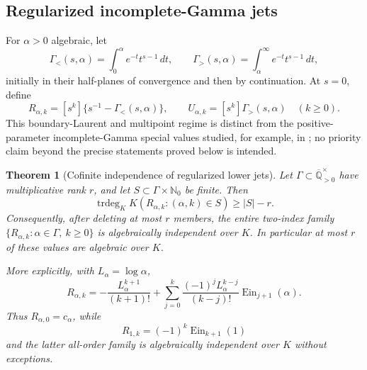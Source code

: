 \documentclass[11pt]{article}
\theoremstyle{keio}
\newtheorem{theorem}{Theorem}[section]
\theoremstyle{definition}
\theoremstyle{remark}
\newcommand{\Qbar}{\overline{\mathbb Q}}
\newcommand{\N}{\mathbb N}
\newcommand{\Ein}{\operatorname{Ein}}
\newcommand{\trdeg}{\operatorname{trdeg}}
\begin{document}
\subsection*{Regularized incomplete-Gamma jets}

For \(\alpha>0\) algebraic, let
\[
 \Gamma_{<}(s,\alpha)=\int_0^\alpha e^{-t}t^{s-1}\,dt,
 \qquad
 \Gamma_{>}(s,\alpha)=\int_\alpha^\infty e^{-t}t^{s-1}\,dt,
\]
initially in their half-planes of convergence and then by continuation.
At \(s=0\), define
\begin{equation}\label{eq:incomplete-gamma-jets}
 R_{\alpha,k}=[s^k]\{s^{-1}-\Gamma_{<}(s,\alpha)\},
 \qquad
 U_{\alpha,k}=[s^k]\Gamma_{>}(s,\alpha)
 \quad(k\ge0).
\end{equation}
This boundary-Laurent and multipoint regime is distinct from the
positive-parameter incomplete-Gamma special values studied, for example,
in \cite{MurtySaha2015}; no priority claim beyond the precise statements
proved below is intended.

\begin{theorem}[Cofinite independence of regularized lower jets]
\label{thm:lower-gamma-jets}
Let \(\Gamma\subset\Qbar_{>0}^{\times}\) have multiplicative rank \(r\),
and let \(S\subset\Gamma\times\N_0\) be finite.  Then
\begin{equation}\label{eq:lower-gamma-jet-defect}
 \boxed{\displaystyle
 \trdeg_KK(R_{\alpha,k}:(\alpha,k)\in S)\ge |S|-r.}
\end{equation}
Consequently, after deleting at most \(r\) members, the entire two-index
family \(\{R_{\alpha,k}:\alpha\in\Gamma,\ k\ge0\}\) is algebraically
independent over \(K\).  In particular at most \(r\) of these values are
algebraic over \(K\).

More explicitly, with \(L_\alpha=\log\alpha\),
\begin{equation}\label{eq:lower-gamma-jet-explicit}
 R_{\alpha,k}=-\frac{L_\alpha^{k+1}}{(k+1)!}
 +\sum_{j=0}^k\frac{(-1)^jL_\alpha^{k-j}}{(k-j)!}
 \Ein_{j+1}(\alpha).
\end{equation}
Thus \(R_{\alpha,0}=c_\alpha\), while
\begin{equation}\label{eq:lower-gamma-at-one}
 R_{1,k}=(-1)^k\Ein_{k+1}(1)
\end{equation}
and the latter all-order family is algebraically independent over \(K\)
without exceptions.
\end{theorem}
\end{document}
